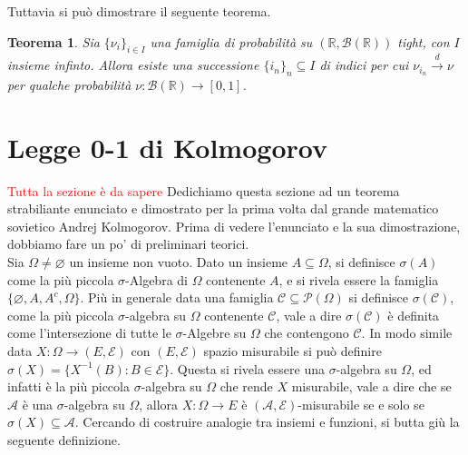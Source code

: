 \documentclass[11pt]{book}
\theoremstyle{Definizione}
\theoremstyle{TeoremaProposizioneLemmaCorollario}
\newtheorem{myteo}{Teorema}[section]
\theoremstyle{OsservazioneNota}
\newcommand{\R}{\mathbb{R}}
\newcommand{\tod}{\overset{d}{\to}}
\begin{document}
Tuttavia si può dimostrare il seguente teorema.
\begin{boxteo}{}
\begin{myteo}
Sia $\{\nu_i\}_{i\in I}$ una famiglia di probabilità su $(\R,\mathcal{B}(\R))$ tight, con $I$ insieme infinto. Allora esiste una successione $\{i_n\}_n\subseteq I$ di indici per cui $\nu_{i_n} \tod \nu$ per qualche probabilità $\nu:\mathcal{B}(\R)\longrightarrow [0,1]$.
\end{myteo}
\end{boxteo}
\section{Legge 0-1 di Kolmogorov}
\textcolor{red}{Tutta la sezione è da sapere}
Dedichiamo questa sezione ad un teorema strabiliante enunciato e dimostrato per la prima volta dal grande matematico sovietico Andrej Kolmogorov. Prima di vedere l'enunciato e la sua dimostrazione, dobbiamo fare un po' di preliminari teorici.\\
Sia $\Omega \neq \varnothing$ un insieme non vuoto. Dato un insieme $A\subseteq \Omega$, si definisce $\sigma(A)$ come la più piccola $\sigma$-Algebra di $\Omega$ contenente $A$, e si rivela essere la famiglia $\{\varnothing,A,A^c,\Omega\}$. Più in generale data una famiglia $\mathcal{C}\subseteq \mathcal{P}(\Omega)$ si definisce $\sigma(\mathcal{C})$, come la più piccola $\sigma$-algebra su $\Omega$ contenente $\mathcal{C}$, vale a dire $\sigma(\mathcal{C})$ è definita come l'intersezione di tutte le $\sigma$-Algebre su $\Omega$ che contengono $\mathcal{C}$. In modo simile data $X:\Omega \longrightarrow (E,\mathcal{E})$ con $(E,\mathcal{E})$ spazio misurabile si può definire $\sigma(X) = \{X^{-1}(B):B\in \mathcal{E}\}$. Questa si rivela essere una $\sigma$-algebra su $\Omega$, ed infatti è la più piccola $\sigma$-algebra su $\Omega$ che rende $X$ misurabile, vale a dire che se $\mathcal{A}$ è una $\sigma$-algebra su $\Omega$, allora $X:\Omega\longrightarrow E$ è $(\mathcal{A},\mathcal{E})$-misurabile se e solo se $\sigma(X)\subseteq \mathcal{A}$. Cercando di costruire analogie tra insiemi e funzioni, si butta giù la seguente definizione.
\end{document}
